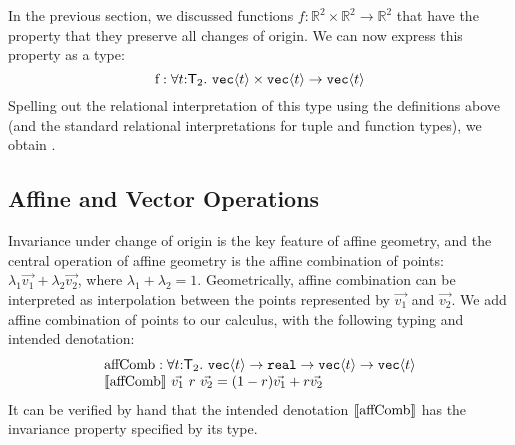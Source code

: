 In the previous section, we discussed functions $f : \mathbb{R}^2
\times \mathbb{R}^2 \to \mathbb{R}^2$ that have the property that they
preserve all changes of origin. We can now express this property as a
type:
\begin{displaymath}
  \mathrm{f} : \forall t \mathord: \SynTransl{2}.\ \tyPrim{vec}{t} \times \tyPrim{vec}{t} \to \tyPrim{vec}{t}
\end{displaymath}
Spelling out the relational interpretation of this type using the
definitions above (and the standard relational interpretations for
tuple and function types), we obtain
.

\subsection{Affine and Vector Operations}
\label{sec:affine-vector-ops}

Invariance under change of origin is the key feature of affine
geometry, and the central operation of affine geometry is the affine
combination of points: $\lambda_1\vec{v_1} + \lambda_2\vec{v_2}$,
where $\lambda_1 + \lambda_2 = 1$. Geometrically, affine combination
can be interpreted as interpolation between the points represented by
$\vec{v_1}$ and $\vec{v_2}$. We add affine combination of points to
our calculus, with the following typing and intended denotation:
\begin{displaymath}
  \begin{array}{l}
    \mathrm{affComb} :\forall t \mathord: \SynTransl{2}.\ \tyPrim{vec}{t} \to \tyPrimNm{real} \to \tyPrim{vec}{t} \to \tyPrim{vec}{t} \\
    \sem{\mathrm{affComb}}\ \vec{v_1}\ r\ \vec{v_2} = (1-r)\vec{v_1} + r\vec{v_2}
  \end{array}
\end{displaymath}
It can be verified by hand that the intended denotation
$\llbracket \mathrm{affComb} \rrbracket$ has the invariance property specified by its
type.

